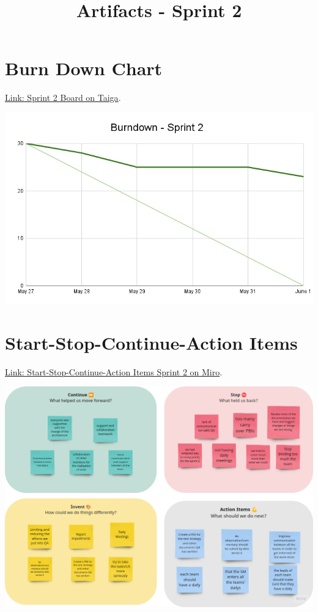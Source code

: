 \documentclass{article}
\title{Artifacts - Sprint 2}
\date{}
\begin{document}
\maketitle

\hypertarget{burndownchart-s2}{
\section{Burn Down Chart}\label{Burn Down Chart S2}}
\href{https://tree.taiga.io/project/joseluis-teran-coffeetime/taskboard/sprint-2-12274}{Link: Sprint 2 Board on Taiga}.

\includegraphics[width=\textwidth]{./assets/Burndown - Sprint 2.png}

\hypertarget{startstopcontinueactionitems-s2}{
\section{Start-Stop-Continue-Action Items}\label{Start-Stop-Continue-Action Items S2}}
\href{https://miro.com/app/board/uXjVKDO7l8M=/?moveToWidget=3458764590247693277&cot=14}{Link: Start-Stop-Continue-Action Items Sprint 2 on Miro}.

\includegraphics[width=\textwidth]{./assets/retrospective-s2.png}
\end{document}
